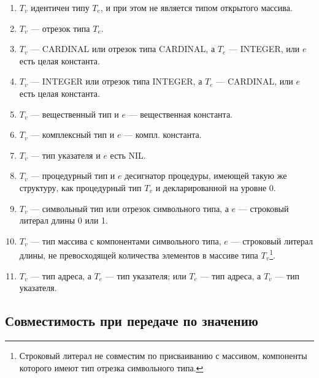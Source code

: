 \renewcommand{\theenumi}{\alph{enumi}}
\begin{enumerate}
\item   $T_v$ идентичен типу $T_e$, и при этом не является типом открытого
массива.

\item   $T_v$ --- отрезок типа $T_e$.

\item   $T_v$ --- CARDINAL или отрезок типа CARDINAL,
        а $T_e$ --- INTEGER, или $e$ есть целая константа.

\item   $T_v$ --- INTEGER или отрезок типа  INTEGER,
        а $T_e$ --- CARDINAL, или $e$ есть целая константа.

\item   $T_v$ --- вещественный тип и $e$ --- вещественная константа.

\item   $T_v$ --- комплексный тип и $e$ --- компл. константа.

\item   $T_v$ --- тип указателя и $e$ есть NIL.

\item   $T_v$ --- процедурный тип и $e$ десигнатор
        процедуры, имеющей такую же структуру, как 
        процедурный тип $T_v$ и декларированной на уровне 0.

\item   $T_v$ --- символьный тип или отрезок символьного типа, а
$e$ --- строковый литерал длины 0 или 1.

\item   $T_v$ --- тип массива с компонентами символьного типа,
$e$ --- строковый литерал длины, не превосходящей количества 
элементов в массиве типа
$T_v$\footnote{Строковый литерал не совместим по присваиванию с 
массивом, компоненты которого имеют тип отрезка символьного типа.}.

\item   $T_v$ --- тип адреса, а $T_e$ --- тип указателя; или
        $T_e$ --- тип адреса, а $T_v$ --- тип указателя. 

\end{enumerate}
\renewcommand{\theenumi}{\arabic{enumi}}

\subsection{Совместимость при передаче по значению}

